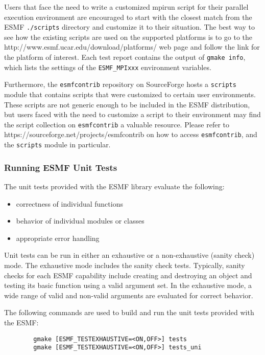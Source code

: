 Users that face the need to write a customized mpirun script for their
parallel execution environment are encouraged to start with the closest match 
from the ESMF {\tt ./scripts} directory and customize it to their situation.
The best way to see how the existing scripts are used on the supported
platforms is to go to the 
{http://www.esmf.ucar.edu/download/platforms/} web page and follow the link 
for the platform of interest. Each test report contains the output of
{\tt gmake info}, which lists the settings of the {\tt ESMF\_MPIxxx} 
environment variables.

Furthermore, the {\tt esmfcontrib} repository on SourceForge hosts a 
{\tt scripts} module that contains scripts that were customized to certain
user environments. These scripts are not generic enough to be included in the
ESMF distribution, but users faced with the need to customize a script to their
environment may find the script collection on {\tt esmfcontrib} a valuable
resource. Please refer to
{https://sourceforge.net/projects/esmfcontrib} on how to access 
{\tt esmfcontrib}, and the {\tt scripts} module in particular.

\subsubsection{Running ESMF Unit Tests}

\label{UnitTestDescription}
The unit tests provided with the ESMF library evaluate the following:
\begin{itemize}
\item correctness of individual functions
\item behavior of individual modules or classes
\item appropriate error handling
\end{itemize}

Unit tests can be run in either an exhaustive or a non-exhaustive (sanity check)
mode.  The exhaustive mode includes the sanity check tests.  Typically, sanity
checks for each ESMF capability include creating and destroying an object and 
testing its basic function using a valid argument set.  In the exhaustive mode,
a wide range of valid and non-valid arguments are evaluated for correct behavior.

\label{RunUnitTests}

The following commands are used to build and run the unit tests provided with 
the ESMF:
\begin{verbatim}
        gmake [ESMF_TESTEXHAUSTIVE=<ON,OFF>] tests
        gmake [ESMF_TESTEXHAUSTIVE=<ON,OFF>] tests_uni
\end{verbatim}

